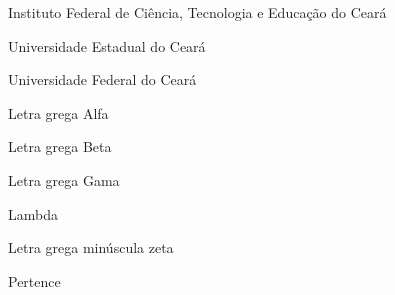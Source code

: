 



\listoffigures*
\cleardoublepage

\listoftables*
\cleardoublepage


\begin{siglas}
\item[IFCE] Instituto Federal de Ciência, Tecnologia e Educação do Ceará
\item[UECE] Universidade Estadual do Ceará
\item[UFC] Universidade Federal do Ceará
\end{siglas}
\cleardoublepage


\begin{simbolos}
  \item[$ \alpha $] Letra grega Alfa
  \item[$ \beta $] Letra grega Beta
  \item[$ \Gamma $] Letra grega Gama
  \item[$ \Lambda $] Lambda
  \item[$ \zeta $] Letra grega minúscula zeta
  \item[$ \in $] Pertence
\end{simbolos}

\renewcommand{\tocheadstart}{\ABNTEXchapterfont}
\tableofcontents*
